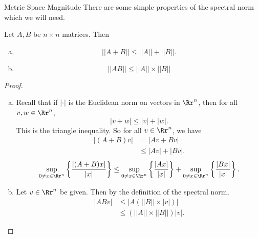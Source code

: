 \documentclass[12pt]{pom_thesis}
\begin{document}
\begin{chapter}{Metric Space Magnitude}
There are some simple properties of the spectral norm which we will need.
\begin{lemma}\label{lem:norm_prop}
Let $A, B$ be $n \times n$ matrices. Then
\begin{enumerate}[(a)]
\item \[
||A + B|| \leq ||A|| + ||B||.
\]
\item \[
||AB|| \leq ||A||\times ||B||
\]
\end{enumerate}
\end{lemma}
\begin{proof}
\begin{enumerate}[(a)]
\item Recall that if $|\cdot|$ is the Euclidean norm on vectors in $\Rr^n$, then for all $v,w \in \Rr^n$,
\[
|v + w| \leq |v| + |w|.
\]
This is the triangle inequality. So for all $v \in \Rr^n$, we have
\begin{align*}
|(A + B)v| &= |Av + Bv| \\
&\leq |Av| + |Bv|.
\end{align*} 
\[\sup_{0 \neq x \in \Rr^n}\left\{ \frac{|(A + B)x|}{|x|} \right\} \leq \sup_{0 \neq x \in \Rr^n}\left\{ \frac{|Ax|}{|x|} \right\} + \sup_{0 \neq x \in \Rr^n}\left\{ \frac{|Bx|}{|x|} \right\}.
\]
\item Let $v \in \Rr^n$ be given. Then by the definition of the spectral norm,
\begin{align*}
|ABv| &\leq |A(||B|| \times |v|)|\\
&\leq (||A|| \times ||B||)|v|.
\end{align*}
\end{enumerate}
\end{proof}


\end{chapter}
\end{document}

